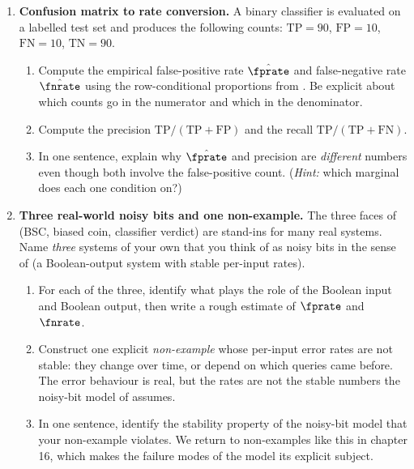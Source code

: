 \begin{enumerate}


\item \exstar
\label{ex:ch1-1}
\textbf{Confusion matrix to rate conversion.}
A binary classifier is evaluated on a labelled test set and produces the
following counts: $\mathrm{TP} = 90$, $\mathrm{FP} = 10$, $\mathrm{FN} = 10$,
$\mathrm{TN} = 90$.
\begin{enumerate}
  \item[(a)] Compute the empirical false-positive rate $\hat{\fprate}$
    and false-negative rate $\hat{\fnrate}$ using the row-conditional
    proportions from . Be explicit about
    which counts go in the numerator and which in the denominator.
  \item[(b)] Compute the precision $\mathrm{TP}/(\mathrm{TP}+\mathrm{FP})$
    and the recall $\mathrm{TP}/(\mathrm{TP}+\mathrm{FN})$.
  \item[(c)] In one sentence, explain why $\hat{\fprate}$ and precision are
    \emph{different} numbers even though both involve the false-positive
    count. (\textit{Hint:} which marginal does each one condition on?)
\end{enumerate}

\item \exstar
\label{ex:ch1-2}
\textbf{Three real-world noisy bits and one non-example.}
The three faces of  (BSC, biased coin, classifier
verdict) are stand-ins for many real systems. Name \emph{three} systems
of your own that you think of as noisy bits in the sense of
 (a Boolean-output system with stable
per-input rates).
\begin{enumerate}
  \item[(a)] For each of the three, identify what plays the role of the
    Boolean input and Boolean output, then write a rough estimate of
    $\fprate$ and $\fnrate$.
  \item[(b)] Construct one explicit \emph{non-example} whose per-input
    error rates are not stable: they change over time, or depend on
    which queries came before. The error behaviour is real, but the
    rates are not the stable numbers the noisy-bit model of
     assumes.
  \item[(c)] In one sentence, identify the stability property of the
    noisy-bit model that your non-example violates. We return to
    non-examples like this in chapter 16, which makes the failure
    modes of the model its explicit subject.
\end{enumerate}


\end{enumerate}

